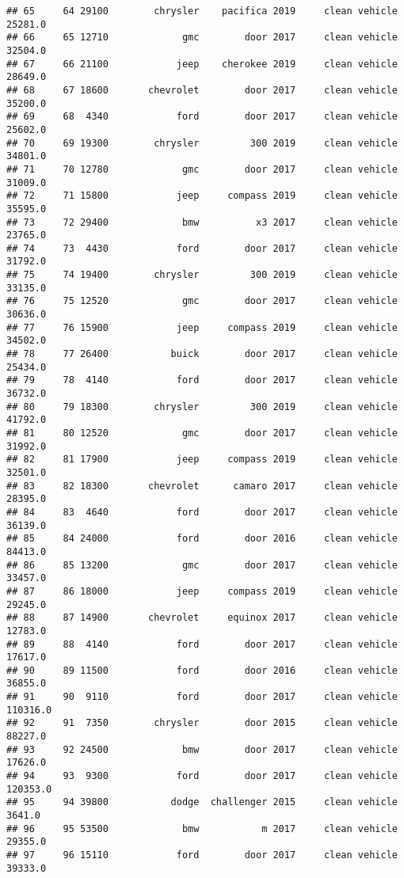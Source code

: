 \documentclass[
]{article}
\begin{document}
\begin{verbatim}
## 65     64 29100        chrysler    pacifica 2019     clean vehicle   25281.0
## 66     65 12710             gmc        door 2017     clean vehicle   32504.0
## 67     66 21100            jeep    cherokee 2019     clean vehicle   28649.0
## 68     67 18600       chevrolet        door 2017     clean vehicle   35200.0
## 69     68  4340            ford        door 2017     clean vehicle   25602.0
## 70     69 19300        chrysler         300 2019     clean vehicle   34801.0
## 71     70 12780             gmc        door 2017     clean vehicle   31009.0
## 72     71 15800            jeep     compass 2019     clean vehicle   35595.0
## 73     72 29400             bmw          x3 2017     clean vehicle   23765.0
## 74     73  4430            ford        door 2017     clean vehicle   31792.0
## 75     74 19400        chrysler         300 2019     clean vehicle   33135.0
## 76     75 12520             gmc        door 2017     clean vehicle   30636.0
## 77     76 15900            jeep     compass 2019     clean vehicle   34502.0
## 78     77 26400           buick        door 2017     clean vehicle   25434.0
## 79     78  4140            ford        door 2017     clean vehicle   36732.0
## 80     79 18300        chrysler         300 2019     clean vehicle   41792.0
## 81     80 12520             gmc        door 2017     clean vehicle   31992.0
## 82     81 17900            jeep     compass 2019     clean vehicle   32501.0
## 83     82 18300       chevrolet      camaro 2017     clean vehicle   28395.0
## 84     83  4640            ford        door 2017     clean vehicle   36139.0
## 85     84 24000            ford        door 2016     clean vehicle   84413.0
## 86     85 13200             gmc        door 2017     clean vehicle   33457.0
## 87     86 18000            jeep     compass 2019     clean vehicle   29245.0
## 88     87 14900       chevrolet     equinox 2017     clean vehicle   12783.0
## 89     88  4140            ford        door 2017     clean vehicle   17617.0
## 90     89 11500            ford        door 2016     clean vehicle   36855.0
## 91     90  9110            ford        door 2017     clean vehicle  110316.0
## 92     91  7350        chrysler        door 2015     clean vehicle   88227.0
## 93     92 24500             bmw        door 2017     clean vehicle   17626.0
## 94     93  9300            ford        door 2017     clean vehicle  120353.0
## 95     94 39800           dodge  challenger 2015     clean vehicle    3641.0
## 96     95 53500             bmw           m 2017     clean vehicle   29355.0
## 97     96 15110            ford        door 2017     clean vehicle   39333.0

\end{verbatim}
\end{document}
